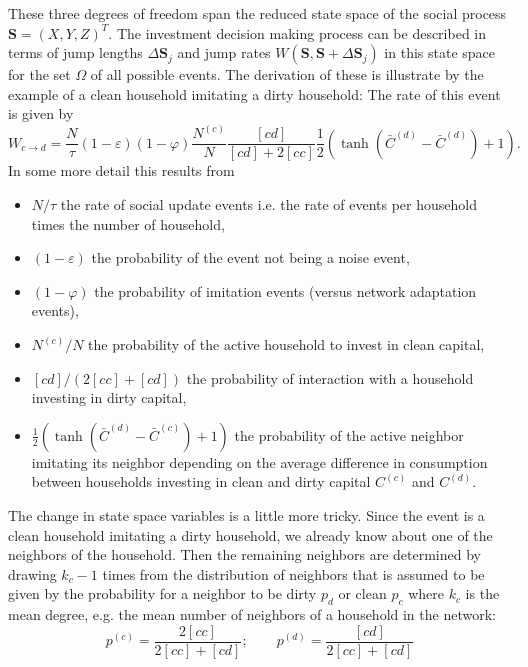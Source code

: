 These three degrees of freedom span the reduced state space of the social process $\mathbf{S} = (X, Y, Z)^T$. The investment decision making process can be described in terms of jump lengths $\Delta \mathbf{S}_j$ and jump rates $W(\mathbf{S},\mathbf{S} + \Delta \mathbf{S}_j)$ in this state space for the set $\Omega$ of all possible events.
The derivation of these is illustrate by the example of a clean household imitating a dirty household: The rate of this event is given by
\begin{equation}
	W_{c \rightarrow d} = \frac{N}{\tau} (1-\varepsilon) (1 - \varphi) \frac{N^{(c)}}{N}\frac{[cd]}{[cd] + 2 [cc]}\frac{1}{2}\left( \tanh(\bar{C}^{(d)} - \bar{C}^{(d)}) + 1 \right).
	\label{cdswitchingprob}
\end{equation}
In some more detail this results from
\begin{itemize}
	\item $N/\tau$ the rate of social update events i.e. the rate of events per household times the number of household,
	\item $(1-\varepsilon)$ the probability of the event not being a noise event,
	\item $(1-\varphi)$ the probability of imitation events (versus network adaptation events),
	\item $N^{(c)}/N$ the probability of the active household to invest in clean capital,
	\item $[cd]/(2[cc] + [cd])$ the probability of interaction with a household investing in dirty capital,
	\item $\frac{1}{2}\left( \tanh(\bar{C}^{(d)} - \bar{C}^{(c)}) + 1 \right)$ the probability of the active neighbor imitating its neighbor depending on the average difference in consumption between households investing in clean and dirty capital $C^{(c)}$ and $C^{(d)}$.
\end{itemize}
The change in state space variables is a little more tricky. Since the event is a clean household imitating a dirty household, we already know about one of the neighbors of the household. Then the remaining neighbors are determined by drawing $k_c - 1$ times from the distribution of neighbors that is assumed to be given by the probability for a neighbor to be dirty $p_d$ or clean $p_c$ where $k_c$ is the mean degree, e.g. the mean number of neighbors of a household in the network:
\begin{equation}
	p^{(c)} = \frac{2 [cc]}{2[cc] + [cd]}; \qquad p^{(d)} = \frac{[cd]}{2[cc] + [cd]}
	\label{neighbordist}
\end{equation}
